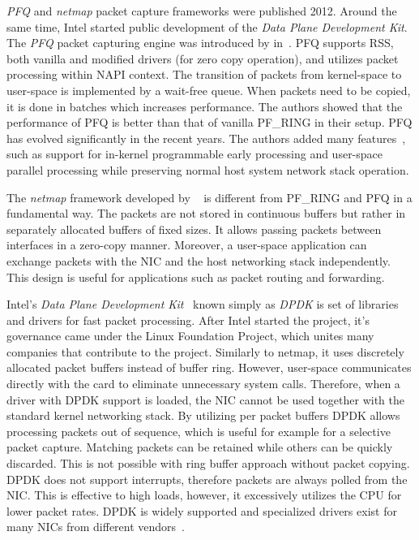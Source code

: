 \emph{PFQ} and \emph{netmap} packet capture frameworks were published 2012. Around the same time, Intel started public development of the \emph{Data Plane Development Kit}. The \emph{PFQ} packet capturing engine was introduced by \citeauthor{Bonelli-2012-Multi} in~\cite{Bonelli-2012-Multi}. PFQ supports RSS, both vanilla and modified drivers (for zero copy operation), and utilizes packet processing within NAPI context. The transition of packets from kernel-space to user-space is implemented by a wait-free queue. When packets need to be copied, it is done in batches which increases performance. The authors showed that the performance of PFQ is better than that of vanilla PF\_RING in their setup. PFQ has evolved significantly in the recent years. The authors added many features~\cite{Bonelli-2014-Purely, Bonelli-2016-Network, Bonelli-2017-Enabling}, such as support for in-kernel programmable early processing and user-space parallel processing while preserving normal host system network stack operation.

The \emph{netmap} framework developed by ~\citeauthor{Rizzo-2012-Netmap} is different from PF\_RING and PFQ in a fundamental way. The packets are not stored in continuous buffers but rather in separately allocated buffers of fixed sizes. It allows passing packets between interfaces in a zero-copy manner. Moreover, a user-space application can exchange packets with the NIC and the host networking stack independently. This design is useful for applications such as packet routing and forwarding.

Intel's \emph{Data Plane Development Kit}~\cite{LFP--Data} known simply as \emph{DPDK} is set of libraries and drivers for fast packet processing. After Intel started the project, it's governance came under the Linux Foundation Project, which unites many companies that contribute to the project. Similarly to netmap, it uses discretely allocated packet buffers instead of buffer ring. However, user-space communicates directly with the card to eliminate unnecessary system calls. Therefore, when a driver with DPDK support is loaded, the NIC cannot be used together with the standard kernel networking stack. By utilizing per packet buffers DPDK allows processing packets out of sequence, which is useful for example for a selective packet capture. Matching packets can be retained while others can be quickly discarded. This is not possible with ring buffer approach without packet copying. DPDK does not support interrupts, therefore packets are always polled from the NIC. This is effective to high loads, however, it excessively utilizes the CPU for lower packet rates. DPDK is widely supported and specialized drivers exist for many NICs from different vendors~\cite{LFP--DPDK}. 

